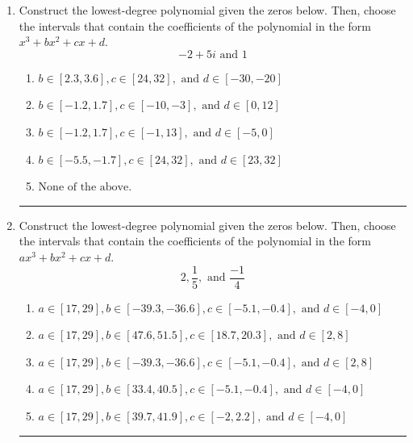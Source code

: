 \documentclass[14pt]{extbook}
\newcommand{\litem}[1]{\item#1\hspace*{-1cm}\rule{\textwidth}{0.4pt}}
\begin{document}
\begin{enumerate}
{\begin{enumerate}[label=\Alph*.]
\end{enumerate} }
\litem{
Construct the lowest-degree polynomial given the zeros below. Then, choose the intervals that contain the coefficients of the polynomial in the form $x^3+bx^2+cx+d$.\[ -2 + 5 i \text{ and } 1 \]\begin{enumerate}[label=\Alph*.]
\item \( b \in [2.3, 3.6], c \in [24, 32], \text{ and } d \in [-30, -20] \)
\item \( b \in [-1.2, 1.7], c \in [-10, -3], \text{ and } d \in [0, 12] \)
\item \( b \in [-1.2, 1.7], c \in [-1, 13], \text{ and } d \in [-5, 0] \)
\item \( b \in [-5.5, -1.7], c \in [24, 32], \text{ and } d \in [23, 32] \)
\item \( \text{None of the above.} \)

\end{enumerate} }
\litem{
Construct the lowest-degree polynomial given the zeros below. Then, choose the intervals that contain the coefficients of the polynomial in the form $ax^3+bx^2+cx+d$.\[ 2, \frac{1}{5}, \text{ and } \frac{-1}{4} \]\begin{enumerate}[label=\Alph*.]
\item \( a \in [17, 29], b \in [-39.3, -36.6], c \in [-5.1, -0.4], \text{ and } d \in [-4, 0] \)
\item \( a \in [17, 29], b \in [47.6, 51.5], c \in [18.7, 20.3], \text{ and } d \in [2, 8] \)
\item \( a \in [17, 29], b \in [-39.3, -36.6], c \in [-5.1, -0.4], \text{ and } d \in [2, 8] \)
\item \( a \in [17, 29], b \in [33.4, 40.5], c \in [-5.1, -0.4], \text{ and } d \in [-4, 0] \)
\item \( a \in [17, 29], b \in [39.7, 41.9], c \in [-2, 2.2], \text{ and } d \in [-4, 0] \)


\end{enumerate}}
\end{enumerate}
\end{document}
